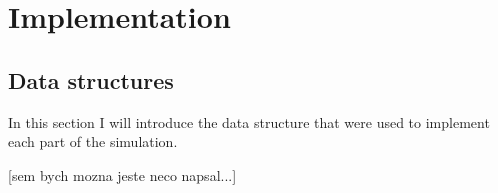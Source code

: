 \chapter{Implementation}

\section{Data structures}

In this section I will introduce the data structure that were used to implement each part of the simulation. 

[sem bych mozna jeste neco napsal...]







                                    